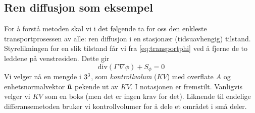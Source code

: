 \subsection{Ren diffusjon som eksempel}
For å forstå metoden skal vi i det følgende ta for oss den enkleste transportprosessen av alle: ren diffusjon i en stasjonær (tidsuavhengig) tilstand. Styrelikningen for en slik tilstand får vi fra \eqref{eq:transportphi} ved å fjerne de to leddene på venstresiden. Dette gir
\begin{equation}\label{eq:endelig_volum_eq}
\text{div}(\Gamma \, \nabla \phi) + S_{\phi} = 0
\end{equation}
Vi velger nå en mengde i $3^3$, som \textit{kontrollvolum} ($KV$) med overflate $A$ og enhetsnormalvektor $\hat{\mathbf{n}}$ pekende ut av $KV$. I  notasjonen er fremstilt. Vanligvis velger vi $KV$ som en boks (men det er ingen krav for det). Liknende til endelige differansemetoden bruker vi kontrollvolumer for å dele et området i små deler.
